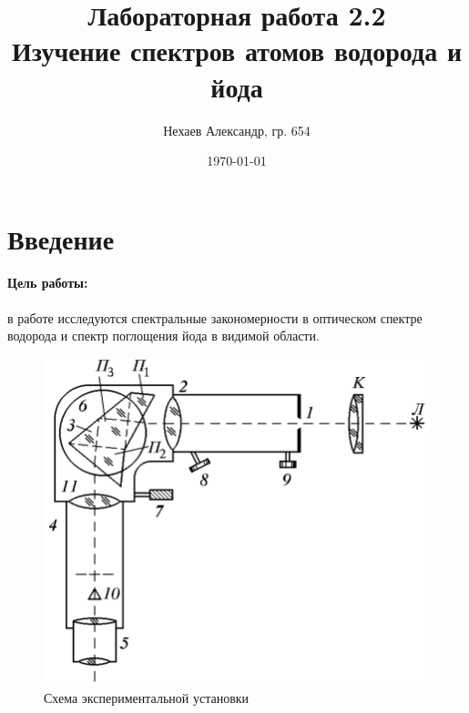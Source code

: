 \documentclass[a4paper, 12pt]{article}
\title{Лабораторная работа 2.2\\Изучение спектров атомов водорода и йода}
\author{Нехаев Александр, гр. 654}
\date{\today}
\begin{document}
\maketitle
\tableofcontents
\section{Введение}
\paragraph{Цель работы:} в работе исследуются спектральные закономерности в оптическом спектре водорода и спектр поглощения йода в видимой области.
\begin{figure}
	\includegraphics[scale=0.2]{scheme.png}
	\caption{Схема экспериментальной установки}
	\label{fig:scheme}
\end{figure}
\end{document}
